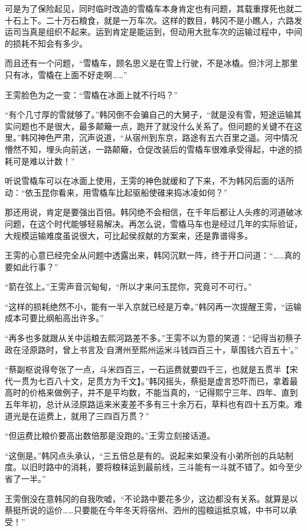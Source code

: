 可是为了保险起见，同时临时改造的雪橇车本身肯定也有问题，其载重撑死也就二十石上下。二十万石粮食，就是一万车次。这样的数目，韩冈不是小瞧人，六路发运司当真是组织不起来。运到肯定是能运到，但动用大批车次的运输过程中，中间的损耗不知会有多少。

而且还有一个问题，“雪橇车，顾名思义是在雪上行驶，不是冰橇。但汴河上那里只有冰，雪橇在上面不好走啊……”

王雱脸色为之一变：“雪橇在冰面上就不行吗？”

“有个几寸厚的雪就够了。”韩冈倒不会骗自己的大舅子，“就是没有雪，短途运输其实问题也不是很大，最多颠簸一点，跑开了就没什么关系了。但问题的关键不在这里。”韩冈神色严肃，沉声说道，“从宿州到东京，路途有五六百里之遥。河中情况懵然不知，埋头向前送，一路颠簸，仓促改装后的雪橇车很难承受得起，中途的损耗可是难以计数！”

听说雪橇车可以在冰面上使用，王雱的神色就缓和了下来，不为韩冈后面的话所动：“依玉昆你看来，用雪橇车比起驱船使碓来捣冰凌如何？”

那还用说，肯定是要强出百倍。韩冈绝不会相信，在千年后都让人头疼的河道破冰问题，在这个时代能够轻易解决。再怎么说，雪橇马车也是经过几年的实际验证，大规模运输难度虽说很大，可比起侯叔献的方案来，还是靠谱得多。

王雱的心意已经完全从问题中透露出来，韩冈沉默一阵，终于开口问道：“……真的要如此行事？”

“箭在弦上。”王雱声音沉甸甸，“所以才来问玉昆你，究竟可不可行。”

“这样的损耗绝然不小，能有一半入京就已经是万幸。”韩冈再一次提醒王雱，“运输成本可要比纲船高出许多。”

“再多也多就跟从关中运粮去熙河路差不多。”王雱不以为意的笑道：“记得当初蔡子政在泾原路时，曾上书言及‘自渭州至熙州运米斗钱四百三十，草围钱六百五十’。”

“蔡副枢说得夸张了一点，斗米四百三，一石运费就要四千三，也就是五贯半【宋代一贯为七百八十文，足贯方为千文】。”韩冈摇头，蔡挺是虚言恐吓而已，拿着最高时的价格来做例子，并不是平均数，不能当真的，“记得熙宁三年、四年、直到五年年初，总计从泾原路运来米麦差不多有三十余万石，草料也有四十五万束。难道光是在运费上，就用了三四百万贯？”

“但运费比粮价要高出数倍那是没跑的。”王雱立刻接话道。

“这倒是。”韩冈点头承认，“三五倍总是有的。说起来如果没有小弟所创的兵站制度。以旧时路中的消耗，要将粮秣运到最前线，三斗能有一斗就不错了。如今至少省了一半。”

王雱倒没在意韩冈的自我吹嘘，“不论路中要花多少，这边都没有关系。就算是以蔡挺所说的运价……只要能在今年冬天将宿州、泗州的囤粮运抵京城，中书可以承受！”

